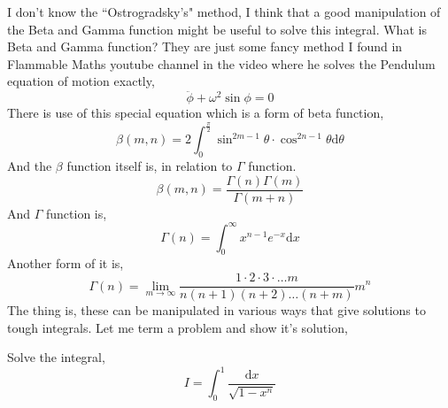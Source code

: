 \documentclass[12pt,a4paper]{article}
\newcommand{ \pk }[1]{\begin{problem} #1 \end{problem} }
\begin{document}
I don't know the ``Ostrogradsky's" method, I think that a good manipulation of the Beta and Gamma function might be useful to solve this integral. What is Beta and Gamma function? They are just some fancy method I found in Flammable Maths youtube channel in the video where he solves the Pendulum equation of motion exactly,
\[ 
\ddot{ \phi } + \omega^2 \sin \phi = 0
\]
There is use of this special equation which is a form of beta function,
\[ 
    \beta\left( m,n \right) = 2 \int_{0}^{\frac{\pi}{2}} \sin ^{2m -1} \theta \cdot  \cos ^{2n-1} \theta \mathrm{d} \theta 
\]
And the $\beta$ function itself is, in relation to $\Gamma$ function.
\[ 
    \beta(m,n) = \frac{\Gamma\left( n \right) \Gamma\left( m \right) }{\Gamma\left( m+n \right) }
\]
And $\Gamma$ function is,
\[ 
    \Gamma(n) = \int_{0}^{\infty} x^{n-1} e^{-x} \mathrm{d} x 
\] 
Another form of it is,
\[ 
    \Gamma(n) = \lim_{m \to \infty} \frac{1\cdot 2\cdot 3\cdot \ldots m}{n \left( n+1 \right) \left( n+2 \right) \ldots \left( n+m \right) } m^{n}
\]
The thing is, these can be manipulated in various ways that give solutions to tough integrals. 
Let me term a problem and show it's solution,
\pk{ 
Solve the integral,
\[ 
I = \int_{0}^{1}  \frac{\mathrm{d}  x}{\sqrt{1 - x^{n}} } 
\]
}   
\end{document}
